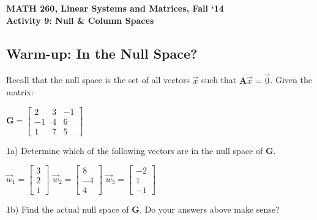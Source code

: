\documentclass{article}
\begin{document}
\begin{flushleft}
	\bfseries{MATH 260, Linear Systems and Matrices, Fall `14}\\
	\bfseries{Activity 9:  Null \& Column Spaces}\\
\end{flushleft}
\begin{flushleft}

\section*{Warm-up:  In the Null Space?}
Recall that the null space is the set of all vectors $\vec{x}$ such that $\textbf{A}\vec{x}=\vec{0}$. Given the matrix:\\
\begin{center}
$\textbf{G}=
\begin{bmatrix}
2 & 3 & -1\\
-1 & 4 & 6 \\
1 &  7 & 5
\end{bmatrix}
$\\
\end{center}
1a) Determine which of the following vectors are in the null space of \textbf{G}.\\
\begin{center}
$ \vec{w}_1=\begin{bmatrix} 3 \\ 2 \\ 1 \end{bmatrix} $
\hspace{0.3in}
$ \vec{w}_2=\begin{bmatrix} 8 \\ -4 \\ 4 \end{bmatrix} $
\hspace{0.3in}
$ \vec{w}_3=\begin{bmatrix} -2 \\ 1 \\ -1 \end{bmatrix} $
\end{center}

\vspace{2in}

1b) Find the actual null space of \textbf{G}. Do your answers above make sense?

\newpage


\end{flushleft}
\end{document}
